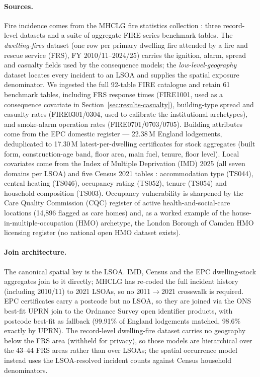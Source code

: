 \paragraph{Sources.}
Fire incidence comes from the MHCLG fire statistics
collection \citep{mhclg2026firestats}: three record-level datasets and a suite of
aggregate FIRE-series benchmark tables. The \emph{dwelling-fires} dataset (one row
per primary dwelling fire attended by a fire and rescue service (FRS), FY
2010/11--2024/25) carries the ignition, alarm, spread and casualty fields used by
the consequence models; the \emph{low-level-geography} dataset locates every
incident to an LSOA and supplies the spatial exposure denominator. We ingested the
full 92-table FIRE catalogue and retain 61 benchmark tables, including FRS
response times (FIRE1001, used as a consequence covariate in
Section~\ref{sec:results-casualty}), building-type spread and casualty rates
(FIRE0301/0304, used to calibrate the institutional archetypes), and smoke-alarm
operation rates (FIRE0701/0703/0705). Building attributes come from the EPC
domestic register \citep{epcregister2025} --- 22.38\,M England lodgements,
deduplicated to 17.30\,M latest-per-dwelling certificates for stock aggregates
(built form, construction-age band, floor area, main fuel, tenure, floor level).
Local covariates come from the Index of Multiple Deprivation (IMD) 2025 (all seven
domains per LSOA) and five Census 2021 tables \citep{ons2021census}: accommodation
type (TS044), central heating (TS046), occupancy rating (TS052), tenure (TS054)
and household composition (TS003). Occupancy vulnerability is sharpened by the Care
Quality Commission (CQC) register of active health-and-social-care locations
(14{,}896 flagged as care homes) and, as a worked example of the
house-in-multiple-occupation (HMO) archetype, the London Borough of Camden HMO
licensing register (no national open HMO dataset exists).

\paragraph{Join architecture.}
The canonical spatial key is the LSOA. IMD, Census and the EPC dwelling-stock
aggregates join to it directly; MHCLG has re-coded the full incident history
(including 2010/11) to 2021 LSOAs, so no 2011$\to$2021 crosswalk is required. EPC
certificates carry a postcode but no LSOA, so they are joined via the ONS best-fit
UPRN join to the Ordnance Survey open identifier products, with postcode
best-fit as fallback (99.91\% of England lodgements matched, 98.6\% exactly
by UPRN). The record-level
dwelling-fire dataset carries no geography below the FRS area (withheld for
privacy), so those models are hierarchical over the 43--44 FRS areas rather than
over LSOAs; the spatial occurrence model instead uses the LSOA-resolved incident
counts against Census household denominators.

